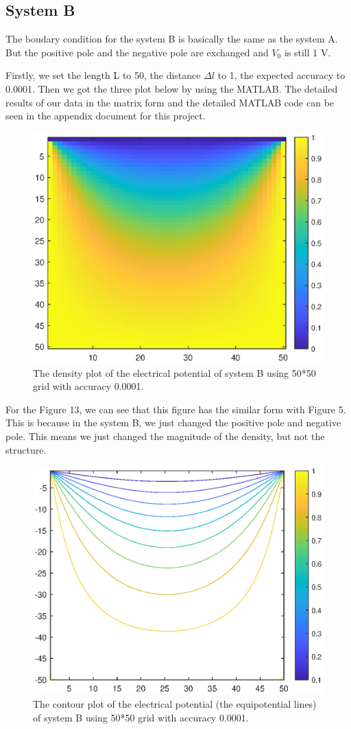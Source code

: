 \documentclass[12pt]{report}
\begin{document}
\subsection{System B}
The boudary condition for the system B is basically the same as the system A. But the positive pole and the negative pole are exchanged and $V_{0}$ is still 1 V.

Firstly, we set the length L to 50, the distance $\Delta l$ to 1, the expected accuracy to 0.0001. Then we got the three plot below by using the MATLAB. The detailed results of our data in the matrix form and the detailed MATLAB code can be seen in the appendix document for this project. 
\begin{figure}[H]
    \centering
    \includegraphics[width=0.8\linewidth]{B00001Density.eps}
    \caption{The density plot of the electrical potential of system B using 50*50 grid with accuracy 0.0001.}
\end{figure}
For the Figure 13, we can see that this figure has the similar form with Figure 5. This is because in the system B, we just changed the positive pole and negative pole. This means we just changed the magnitude of the density, but not the structure.
\begin{figure}[H]
    \centering
    \includegraphics[width=0.8\linewidth]{B00001Contour.eps}
    \caption{The contour plot of the electrical potential (the equipotential lines) of system B using 50*50 grid with accuracy 0.0001.}
\end{figure}
\end{document}
